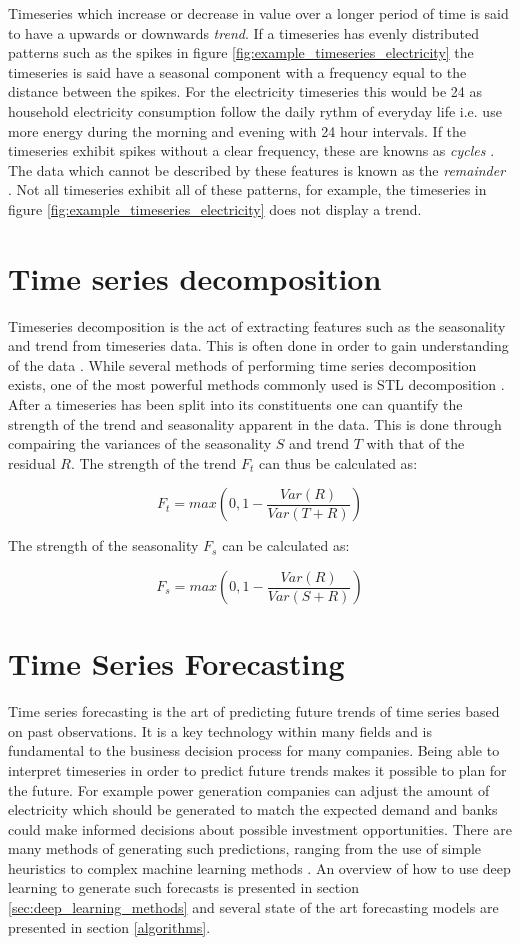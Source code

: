 Timeseries which increase or decrease in value over a longer period of time is said to have a upwards or downwards \textit{trend}. If a timeseries has evenly distributed patterns such as the spikes in figure \ref{fig:example_timeseries_electricity} the timeseries is said have a seasonal component with a frequency equal to the distance between the spikes. For the electricity timeseries this would be 24 as household electricity consumption follow the daily rythm of everyday life i.e. use more energy during the morning and evening with 24 hour intervals. If the timeseries exhibit spikes without a clear frequency, these are knowns as \textit{cycles} \cite{bauer2021libra}. The data which cannot be described by these features is known as the \textit{remainder} \cite{hyndman_forecasting_3rd}. Not all timeseries exhibit all of these patterns, for example, the timeseries in figure \ref{fig:example_timeseries_electricity} does not display a trend.

\section{Time series decomposition}
Timeseries decomposition is the act of extracting features such as the seasonality and trend from timeseries data. This is often done in order to gain understanding of the data \cite{hyndman_forecasting_3rd}. While several methods of performing time series decomposition exists, one of the most powerful methods commonly used is STL decomposition \cite{hyndman_forecasting_3rd}. After a timeseries has been split into its constituents one can quantify the strength of the trend and seasonality apparent in the data. This is done through compairing the variances of the seasonality \(S\) and trend \(T\) with that of the residual \(R\). The strength of the trend \(F_t\) can thus be calculated as:

\[ F_t = max(0,1-\frac{Var(R)}{Var(T + R)}) \]

The strength of the seasonality \(F_s\) can be calculated as:

\[ F_s = max(0,1-\frac{Var(R)}{Var(S + R)}) \]


\section{Time Series Forecasting}
\label{sec_time_series_forecasting}
Time series forecasting is the art of predicting future trends of time series based on past observations. It is a key technology within many fields and is fundamental to the business decision process for many companies. Being able to interpret timeseries in order to predict future trends makes it possible to plan for the future. For example power generation companies can adjust the amount of electricity which should be generated to match the expected demand and banks could make informed decisions about possible investment opportunities. There are many methods of generating such predictions, ranging from the use of simple heuristics to complex machine learning methods \cite{hyndman_forecasting_3rd}. An overview of how to use deep learning to generate such forecasts is presented in section \ref{sec:deep_learning_methods} and several state of the art forecasting models are presented in section \ref{algorithms}.

